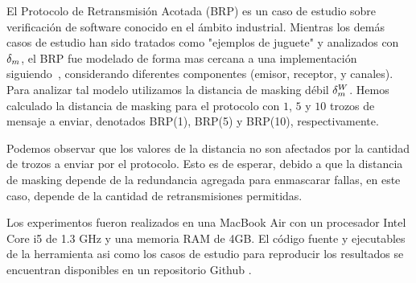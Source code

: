 El Protocolo de Retransmisión Acotada (BRP) es un caso de estudio sobre verificación de software conocido en el ámbito industrial. Mientras los demás casos de estudio han sido tratados como "ejemplos de juguete" y analizados con $\delta_{m}$, el BRP fue modelado de forma mas cercana a una implementación siguiendo~\cite{GrooteP96}, considerando diferentes componentes (emisor, receptor, y canales). Para analizar tal modelo utilizamos la distancia de masking débil $\delta_{m}^W$.
Hemos calculado la distancia de masking para el protocolo con $1$, $5$ y $10$ trozos de mensaje a enviar, denotados BRP(1), BRP(5) y BRP(10), respectivamente. 

Podemos observar que los valores de la distancia no son afectados por la cantidad de trozos a enviar por el protocolo. Esto es de esperar, debido a que la distancia de masking depende de la redundancia agregada para enmascarar fallas, en este caso, depende de la cantidad de retransmisiones permitidas.

Los experimentos fueron realizados en una MacBook Air con un procesador Intel Core i5 de 1.3 GHz y una memoria RAM de 4GB. El código fuente y ejecutables de la herramienta asi como los casos de estudio para reproducir los resultados se encuentran disponibles en un repositorio Github \cite{MaskD}.




